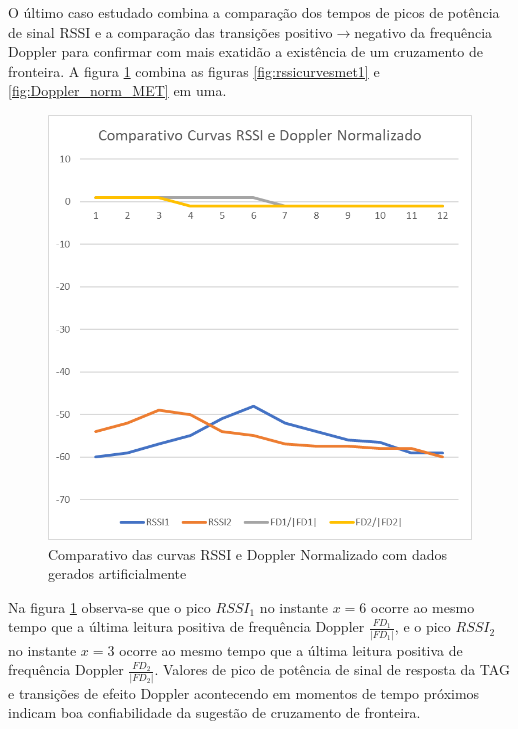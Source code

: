 O último caso estudado combina a comparação dos tempos de picos de potência de sinal RSSI e a comparação das transições positivo$\rightarrow$negativo da frequência Doppler para confirmar com mais exatidão a existência de um cruzamento de fronteira. A figura \ref{fig:RSSI_Doppler_norm_MET} combina as figuras \ref{fig:rssicurvesmet1} e \ref{fig:Doppler_norm_MET} em uma.

   \begin{figure}[H]
    \centering
    \includegraphics[width=0.8\linewidth]{figs/Metodologia/image009.png}
    \caption{Comparativo das curvas RSSI e Doppler Normalizado com dados gerados artificialmente}
    \label{fig:RSSI_Doppler_norm_MET}
\end{figure}

Na figura \ref{fig:RSSI_Doppler_norm_MET} observa-se que o pico $RSSI_1$ no instante $x=6$ ocorre ao mesmo tempo que a última leitura positiva de frequência Doppler $\frac{FD_1}{|FD_1|}$, e o pico $RSSI_2$ no instante $x=3$ ocorre ao mesmo tempo que a última leitura positiva de frequência Doppler $\frac{FD_2}{|FD_2|}$. Valores de pico de potência de sinal de resposta da TAG e transições de efeito Doppler acontecendo em momentos de tempo próximos indicam boa confiabilidade da sugestão de cruzamento de fronteira.